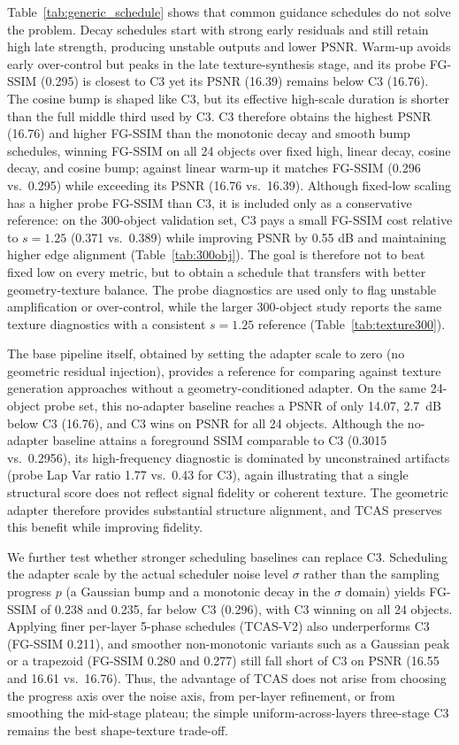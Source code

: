 \documentclass[times,twocolumn,final]{elsarticle}
\begin{document}
Table~\ref{tab:generic_schedule} shows that common guidance schedules do not solve the problem. Decay schedules start with strong early residuals and still retain high late strength, producing unstable outputs and lower PSNR. Warm-up avoids early over-control but peaks in the late texture-synthesis stage, and its probe FG-SSIM (0.295) is closest to C3 yet its PSNR (16.39) remains below C3 (16.76). The cosine bump is shaped like C3, but its effective high-scale duration is shorter than the full middle third used by C3. C3 therefore obtains the highest PSNR (16.76) and higher FG-SSIM than the monotonic decay and smooth bump schedules, winning FG-SSIM on all 24 objects over fixed high, linear decay, cosine decay, and cosine bump; against linear warm-up it matches FG-SSIM (0.296 vs.\ 0.295) while exceeding its PSNR (16.76 vs.\ 16.39). Although fixed-low scaling has a higher probe FG-SSIM than C3, it is included only as a conservative reference: on the 300-object validation set, C3 pays a small FG-SSIM cost relative to $s = 1.25$ (0.371 vs.\ 0.389) while improving PSNR by 0.55 dB and maintaining higher edge alignment (Table~\ref{tab:300obj}). The goal is therefore not to beat fixed low on every metric, but to obtain a schedule that transfers with better geometry-texture balance. The probe diagnostics are used only to flag unstable amplification or over-control, while the larger 300-object study reports the same texture diagnostics with a consistent $s=1.25$ reference (Table~\ref{tab:texture300}).

The base pipeline itself, obtained by setting the adapter scale to zero (no geometric residual injection), provides a reference for comparing against texture generation approaches without a geometry-conditioned adapter. On the same 24-object probe set, this no-adapter baseline reaches a PSNR of only 14.07, 2.7~dB below C3 (16.76), and C3 wins on PSNR for all 24 objects. Although the no-adapter baseline attains a foreground SSIM comparable to C3 (0.3015 vs.\ 0.2956), its high-frequency diagnostic is dominated by unconstrained artifacts (probe Lap Var ratio 1.77 vs.\ 0.43 for C3), again illustrating that a single structural score does not reflect signal fidelity or coherent texture. The geometric adapter therefore provides substantial structure alignment, and TCAS preserves this benefit while improving fidelity.

We further test whether stronger scheduling baselines can replace C3. Scheduling the adapter scale by the actual scheduler noise level $\sigma$ rather than the sampling progress $p$ (a Gaussian bump and a monotonic decay in the $\sigma$ domain) yields FG-SSIM of 0.238 and 0.235, far below C3 (0.296), with C3 winning on all 24 objects. Applying finer per-layer 5-phase schedules (TCAS-V2) also underperforms C3 (FG-SSIM 0.211), and smoother non-monotonic variants such as a Gaussian peak or a trapezoid (FG-SSIM 0.280 and 0.277) still fall short of C3 on PSNR (16.55 and 16.61 vs.\ 16.76). Thus, the advantage of TCAS does not arise from choosing the progress axis over the noise axis, from per-layer refinement, or from smoothing the mid-stage plateau; the simple uniform-across-layers three-stage C3 remains the best shape-texture trade-off.
\end{document}
